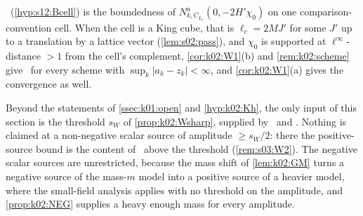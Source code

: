 \begin{remark}\label{rem:k02:cell}
\Bcell\ (\cref{hyp:s12:Bcell}) is the boundedness of $N^a_{k,C_{L_c}}(0,-2H'\chi_0)$ on one comparison-convention cell. When the cell is a King cube, that is $\ell_c=2MJ'$ for some $J'$ up to a translation by a lattice vector (\cref{lem:s02:pass}), and $\chi_0$ is supported at $\ell^\infty$-distance $>1$ from the cell's complement, \cref{cor:k02:W1}(b) and \cref{rem:k02:scheme} give \Bcell\ for every scheme with $\sup_k|a_k-z_k|<\infty$, and \cref{cor:k02:W1}(a) gives the convergence as well.
\end{remark}

\begin{remark}\label{rem:k02:scope}
Beyond the statements of \cref{ssec:k01:open} and \cref{hyp:k02:Kh}, the only input of this section is the threshold $s_W$ of \cref{prop:k02:Wsharp}, supplied by \Itwo\ and \Ithree. Nothing is claimed at a non-negative scalar source of amplitude $\ge s_W/2$: there the positive-source bound is the content of \Wtwo\ above the threshold (\cref{rem:s03:W2}). The negative scalar sources are unrestricted, because the mass shift of \cref{lem:k02:GM} turns a negative source of the mass-$m$ model into a positive source of a heavier model, where the small-field analysis applies with no threshold on the amplitude, and \cref{prop:k02:NEG} supplies a heavy enough mass for every amplitude.
\end{remark}
